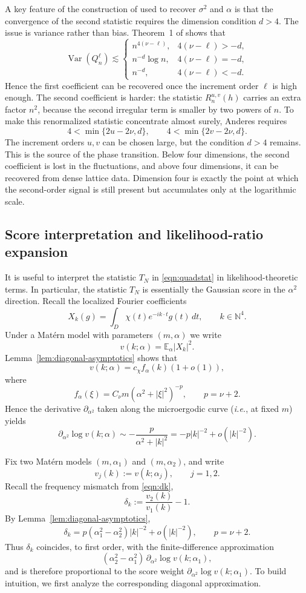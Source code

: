 \documentclass[11pt, reqno]{amsart}
\theoremstyle{remark}
\newcommand{\N}{\mathbb{N}}
\newcommand{\E}{\mathbb{E}}
\newcommand{\1}{\mathbf{1}}
\begin{document}
A key feature of the construction of \citet{Anderes2010} used to recover
\(\sigma^2\) and \(\alpha\) is that the convergence of the second statistic
requires the dimension condition \(d>4\).
The issue is variance rather than bias.
Theorem~1 of \citet{Anderes2010} shows that
\[
\operatorname{Var}(Q_n^\ell)
\lesssim
\begin{cases}
n^{4(\nu-\ell)}, & 4(\nu-\ell)>-d,\\[4pt]
n^{-d}\log n, & 4(\nu-\ell)=-d,\\[4pt]
n^{-d}, & 4(\nu-\ell)<-d.
\end{cases}
\]
Hence the first coefficient can be recovered once the increment order $\ell$ is high enough.
The second coefficient is harder: the statistic \(R_n^{u,v}(h)\) carries an extra
factor \(n^2\), because the second irregular term is smaller by two powers of \(n\).
To make this renormalized statistic concentrate almost surely, Anderes requires
\[
4<\min\{2u-2\nu,d\},
\qquad
4<\min\{2v-2\nu,d\}.
\]
The increment orders \(u,v\) can be chosen large, but the condition \(d>4\) remains.
This is the source of the phase transition. Below four dimensions, the second
coefficient is lost in the fluctuations, and above four dimensions, it can be recovered
from dense lattice data. Dimension four is exactly the point at which the second-order
signal is still present but accumulates only at the logarithmic scale.

\subsection{Score interpretation and likelihood-ratio expansion} \label{sec:infscale}

It is useful to interpret the statistic $T_N$ in \eqref{eqn:quadstat}
in likelihood-theoretic terms. In particular, the statistic $T_N$
is essentially the Gaussian score in the $\alpha^2$ direction.
Recall the localized Fourier coefficients
\[
X_k(g)
=
\int_D \chi(t)e^{-ik\cdot t}g(t)\,dt,
\qquad k\in\N^4 .
\]
Under a Mat\'ern model with parameters $(m,\alpha)$ we write
\[
v(k;\alpha)=\E_\alpha |X_k|^2 .
\]
Lemma~\ref{lem:diagonal-asymptotics} shows that
\[
v(k;\alpha)=c_\chi f_\alpha(k)(1+o(1)),
\]
where
\[
f_\alpha(\xi)
=
C_\nu m(\alpha^2+|\xi|^2)^{-p},
\qquad p=\nu+2 .
\]
Hence the derivative $\partial_{\alpha^2}$ taken along the
microergodic curve (\textit{i.e.}, at fixed $m$) yields
\[
\partial_{\alpha^2}\log v(k;\alpha)
\sim
-\frac{p}{\alpha^2+|k|^2}
=
-p|k|^{-2}+o(|k|^{-2}) .
\]

Fix two Mat\'ern models \((m,\alpha_1)\) and \((m,\alpha_2)\), and write
\[
v_j(k):=v(k;\alpha_j), \qquad j=1,2.
\]
Recall the frequency mismatch from \eqref{eqn:dk},
\[
\delta_k:=\frac{v_2(k)}{v_1(k)}-1.
\]
By Lemma~\ref{lem:diagonal-asymptotics},
\[
\delta_k
=
p(\alpha_1^2-\alpha_2^2)|k|^{-2}+o(|k|^{-2}),
\qquad p=\nu+2.
\]
Thus \(\delta_k\) coincides, to first order, with the finite-difference approximation
\[
(\alpha_2^2-\alpha_1^2)\,\partial_{\alpha^2}\log v(k;\alpha_1),
\]
and is therefore proportional to the score weight \(\partial_{\alpha^2}\log v(k;\alpha_1)\).
To build intuition, we first analyze the corresponding diagonal
approximation.
\end{document}
